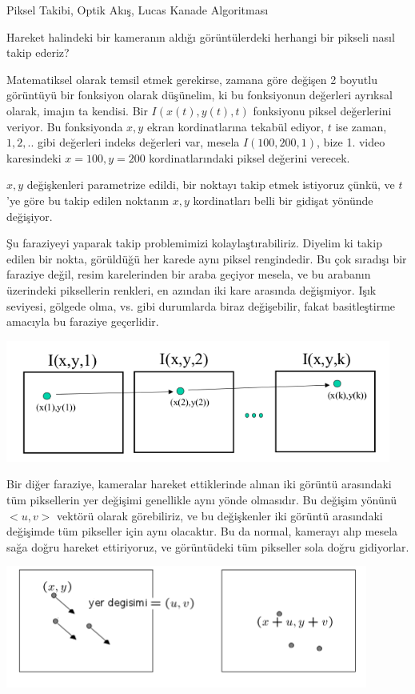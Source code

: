 \documentclass[12pt,fleqn]{article}\usepackage{../../common}
\begin{document}
Piksel Takibi, Optik Akış, Lucas Kanade Algoritması

Hareket halindeki bir kameranın aldığı görüntülerdeki herhangi bir pikseli
nasıl takip ederiz? 

Matematiksel olarak temsil etmek gerekirse, zamana göre değişen 2 boyutlu
görüntüyü bir fonksiyon olarak düşünelim, ki bu fonksiyonun değerleri
ayrıksal olarak, imajın ta kendisi. Bir $I(x(t),y(t),t)$ fonksiyonu piksel
değerlerini veriyor. Bu fonksiyonda $x,y$ ekran kordinatlarına tekabül
ediyor, $t$ ise zaman, $1,2,..$ gibi değerleri indeks değerleri var, mesela
$I(100,200,1)$, bize 1. video karesindeki $x=100,y=200$ kordinatlarındaki
piksel değerini verecek.

$x,y$ değişkenleri parametrize edildi, bir noktayı takip etmek istiyoruz
çünkü, ve $t$'ye göre bu takip edilen noktanın $x,y$ kordinatları belli bir
gidişat yönünde değişiyor.

Şu faraziyeyi yaparak takip problemimizi kolaylaştırabiliriz. Diyelim ki
takip edilen bir nokta, görüldüğü her karede aynı piksel rengindedir. Bu
çok sıradışı bir faraziye değil, resim karelerinden bir araba geçiyor
mesela, ve bu arabanın üzerindeki piksellerin renkleri, en azından iki kare
arasında değişmiyor. Işık seviyesi, gölgede olma, vs. gibi durumlarda biraz
değişebilir, fakat basitleştirme amacıyla bu faraziye geçerlidir. 

\includegraphics[height=4cm]{disp2.png}

Bir diğer faraziye, kameralar hareket ettiklerinde alınan iki görüntü
arasındaki tüm piksellerin yer değişimi genellikle aynı yönde olmasıdır. Bu
değişim yönünü $<u,v>$ vektörü olarak görebiliriz, ve bu değişkenler iki
görüntü arasındaki değişimde tüm pikseller için aynı olacaktır. Bu da
normal, kamerayı alıp mesela sağa doğru hareket ettiriyoruz, ve görüntüdeki
tüm pikseller sola doğru gidiyorlar.

\includegraphics[height=4cm]{disp1.png}
\end{document}
